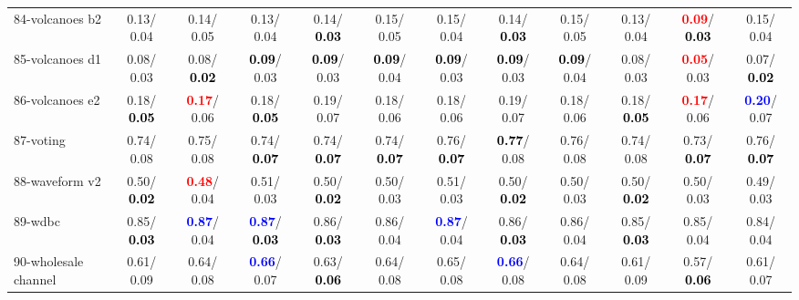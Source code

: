 \begin{table}[h]
\begin{center}
{\begin{tabular}{lc|c|c|c|c|c|c|c|c|c|c}
84-volcanoes b2 &   0.13/  0.04 &   0.14/  0.05 &   0.13/  0.04 &   0.14/\textcolor{black}{\textbf{  0.03}} &   0.15/  0.05 &   0.15/  0.04 &   0.14/\textcolor{black}{\textbf{  0.03}} &   0.15/  0.05 &   0.13/  0.04 & \textcolor{red}{\textbf{  0.09}}/\textcolor{black}{\textbf{  0.03}} &   0.15/  0.04 \\
85-volcanoes d1 &   0.08/  0.03 &   0.08/\textcolor{black}{\textbf{  0.02}} & \textcolor{black}{\textbf{  0.09}}/  0.03 & \textcolor{black}{\textbf{  0.09}}/  0.03 & \textcolor{black}{\textbf{  0.09}}/  0.04 & \textcolor{black}{\textbf{  0.09}}/  0.03 & \textcolor{black}{\textbf{  0.09}}/  0.03 & \textcolor{black}{\textbf{  0.09}}/  0.04 &   0.08/  0.03 & \textcolor{red}{\textbf{  0.05}}/  0.03 &   0.07/\textcolor{black}{\textbf{  0.02}} \\ \hline
86-volcanoes e2 &   0.18/\textcolor{black}{\textbf{  0.05}} & \textcolor{red}{\textbf{  0.17}}/  0.06 &   0.18/\textcolor{black}{\textbf{  0.05}} &   0.19/  0.07 &   0.18/  0.06 &   0.18/  0.06 &   0.19/  0.07 &   0.18/  0.06 &   0.18/\textcolor{black}{\textbf{  0.05}} & \textcolor{red}{\textbf{  0.17}}/  0.06 & \textcolor{blue}{\textbf{  0.20}}/  0.07 \\
87-voting &   0.74/  0.08 &   0.75/  0.08 &   0.74/\textcolor{black}{\textbf{  0.07}} &   0.74/\textcolor{black}{\textbf{  0.07}} &   0.74/\textcolor{black}{\textbf{  0.07}} &   0.76/\textcolor{black}{\textbf{  0.07}} & \textcolor{black}{\textbf{  0.77}}/  0.08 &   0.76/  0.08 &   0.74/  0.08 &   0.73/\textcolor{black}{\textbf{  0.07}} &   0.76/\textcolor{black}{\textbf{  0.07}} \\
88-waveform v2 &   0.50/\textcolor{black}{\textbf{  0.02}} & \textcolor{red}{\textbf{  0.48}}/  0.04 &   0.51/  0.03 &   0.50/\textcolor{black}{\textbf{  0.02}} &   0.50/  0.03 &   0.51/  0.03 &   0.50/\textcolor{black}{\textbf{  0.02}} &   0.50/  0.03 &   0.50/\textcolor{black}{\textbf{  0.02}} &   0.50/  0.03 &   0.49/  0.03 \\
89-wdbc &   0.85/\textcolor{black}{\textbf{  0.03}} & \textcolor{blue}{\textbf{  0.87}}/  0.04 & \textcolor{blue}{\textbf{  0.87}}/\textcolor{black}{\textbf{  0.03}} &   0.86/\textcolor{black}{\textbf{  0.03}} &   0.86/  0.04 & \textcolor{blue}{\textbf{  0.87}}/  0.04 &   0.86/\textcolor{black}{\textbf{  0.03}} &   0.86/  0.04 &   0.85/\textcolor{black}{\textbf{  0.03}} &   0.85/  0.04 &   0.84/  0.04 \\
90-wholesale channel &   0.61/  0.09 &   0.64/  0.08 & \textcolor{blue}{\textbf{  0.66}}/  0.07 &   0.63/\textcolor{black}{\textbf{  0.06}} &   0.64/  0.08 &   0.65/  0.08 & \textcolor{blue}{\textbf{  0.66}}/  0.08 &   0.64/  0.08 &   0.61/  0.09 &   0.57/\textcolor{black}{\textbf{  0.06}} &   0.61/  0.07 \\

\end{tabular}}
\end{center}
\end{table}
